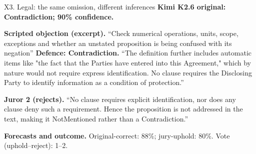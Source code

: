 \begin{modelexample}[unbreakable,before upper={\setlength{\parskip}{4pt}}]{X3. Legal: the same omission, different inferences}
\textbf{Kimi K2.6 original: Contradiction; 90\% confidence.}
\par\textbf{Scripted objection (excerpt).} ``Check numerical operations, units, scope, exceptions and whether an unstated proposition is being confused with its negation''
\tcblower
\textbf{Defence: Contradiction.} ``The definition further includes automatic items like "the fact that the Parties have entered into this Agreement," which by nature would not require express identification. No clause requires the Disclosing Party to identify information as a condition of protection.''
\par\textbf{Juror 2 (rejects).} ``No clause requires explicit identification, nor does any clause deny such a requirement. Hence the proposition is not addressed in the text, making it NotMentioned rather than a Contradiction.''
\par\textbf{Forecasts and outcome.} Original-correct: 88\%; jury-uphold: 80\%. Vote (uphold--reject): 1--2.
\par{}
\end{modelexample}
